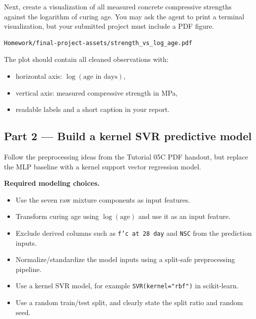 \documentclass[12pt]{article}
\begin{document}
Next, create a visualization of all measured concrete compressive strengths against the logarithm of curing age.  You may ask the agent to print a terminal visualization, but your submitted project must include a PDF figure.

\begin{lstlisting}[style=term]
Homework/final-project-assets/strength_vs_log_age.pdf
\end{lstlisting}

The plot should contain all cleaned observations with:
\begin{itemize}[nosep]
  \item horizontal axis: $\log(\text{age in days})$,
  \item vertical axis: measured compressive strength in MPa,
  \item readable labels and a short caption in your report.
\end{itemize}

\subsection{Part 2 --- Build a kernel SVR predictive model}

Follow the preprocessing ideas from the Tutorial 05C PDF handout, but replace the MLP baseline with a kernel support vector regression model.

\begin{def-box}
\textbf{Required modeling choices.}
\begin{itemize}[nosep]
  \item Use the seven raw mixture components as input features.
  \item Transform curing age using $\log(\text{age})$ and use it as an input feature.
  \item Exclude derived columns such as \texttt{f'c at 28 day} and \texttt{NSC} from the prediction inputs.
  \item Normalize/standardize the model inputs using a split-safe preprocessing pipeline.
  \item Use a kernel SVR model, for example \texttt{SVR(kernel="rbf")} in scikit-learn.
  \item Use a random train/test split, and clearly state the split ratio and random seed.
\end{itemize}
\end{def-box}
\end{document}
